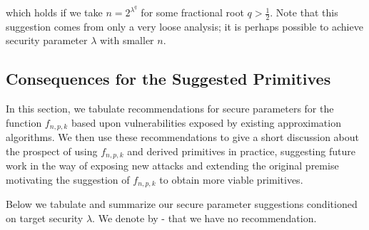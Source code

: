 \documentclass{article}
\theoremstyle{definition}
\begin{document}
\noindent which holds if we take $n = 2^{\lambda^q}$ for some fractional 
root $q > \frac{1}{2}$.  Note that this 
suggestion comes from only a very loose analysis; it is perhaps possible to 
achieve security parameter $\lambda$ with smaller $n$.

\subsection{Consequences for the Suggested Primitives}

In this section, we tabulate recommendations for secure parameters for the function 
$f_{n,p,k}$ based upon vulnerabilities exposed by existing approximation algorithms.
We then use these recommendations to give a short discussion about the prospect 
of using $f_{n,p,k}$ and derived primitives in practice, suggesting future work in the 
way of exposing new attacks and extending the original premise motivating 
the suggestion of $f_{n,p,k}$ to obtain more viable primitives.

Below we tabulate and summarize our secure parameter suggestions conditioned on 
target security $\lambda$.  We denote by - that we have no recommendation.
\end{document}
